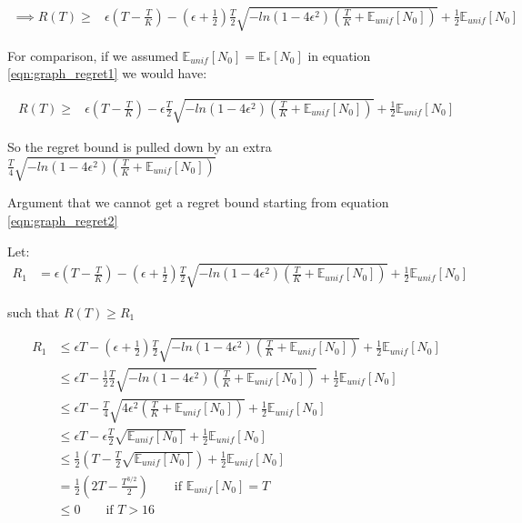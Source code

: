 \documentclass{article}
\newcommand{\E}{\mathbb E}
\newcommand{\eqn}[1]{\begin{align}#1\end{align}}
\newcommand{\Eu}[1]{\E_{unif}\left[ #1 \right]}
\newcommand{\Es}[1]{\E_{*}\left[ #1 \right]}
\theoremstyle{plain}
\theoremstyle{definition}
\begin{document}
\eqn{
\label{eqn:graph_regret2}
\implies R(T) \geq & 
\epsilon(T - \frac{T}{K})-(\epsilon + \frac{1}{2})\frac{T}{2}\sqrt{-ln(1-4\epsilon^2)(\frac{T}{K}+\Eu{N_0})} +\frac{1}{2}\Eu{N_0} 
}

For comparison, if we assumed $\Eu{N_0}=\Es{N_0}$ in equation \ref{eqn:graph_regret1} we would have:

\eqn{
R(T) \geq & 
\epsilon(T - \frac{T}{K})-\epsilon\frac{T}{2}\sqrt{-ln(1-4\epsilon^2)(\frac{T}{K}+\Eu{N_0})} +\frac{1}{2}\Eu{N_0} 
}

So the regret bound is pulled down by an extra  $\frac{T}{4}\sqrt{-ln(1-4\epsilon^2)(\frac{T}{K}+\Eu{N_0})}$ 


Argument that we cannot get a regret bound starting from equation \ref{eqn:graph_regret2}

Let: 
\eqn {
R_1 &= \epsilon(T - \frac{T}{K})-(\epsilon+\frac{1}{2})\frac{T}{2}\sqrt{-ln(1-4\epsilon^2)(\frac{T}{K}+\Eu{N_0})} +\frac{1}{2}\Eu{N_0} 
}

such that  $R(T) \geq R_1$ 

\eqn {
R_1 & \leq \epsilon T-(\epsilon+\frac{1}{2})\frac{T}{2}\sqrt{-ln(1-4\epsilon^2)(\frac{T}{K}+\Eu{N_0})} +\frac{1}{2}\Eu{N_0} \\
& \leq \epsilon T-\frac{1}{2}\frac{T}{2}\sqrt{-ln(1-4\epsilon^2)(\frac{T}{K}+\Eu{N_0})} +\frac{1}{2}\Eu{N_0} \\
& \leq \epsilon T-\frac{T}{4}\sqrt{4\epsilon^2(\frac{T}{K}+\Eu{N_0})} +\frac{1}{2}\Eu{N_0} \\
& \leq \epsilon T-\epsilon\frac{T}{2}\sqrt{\Eu{N_0}} +\frac{1}{2}\Eu{N_0} \\
& \leq \frac{1}{2}\left(T-\frac{T}{2}\sqrt{\Eu{N_0}}\right) +\frac{1}{2}\Eu{N_0} \\
&= \frac{1}{2}\left(2T-\frac{T^{3/2}}{2}\right) \qquad \text{if $\Eu{N_0} = T$}\\ 
& \leq 0 \qquad \text{if $T > 16$}
}
\end{document}
